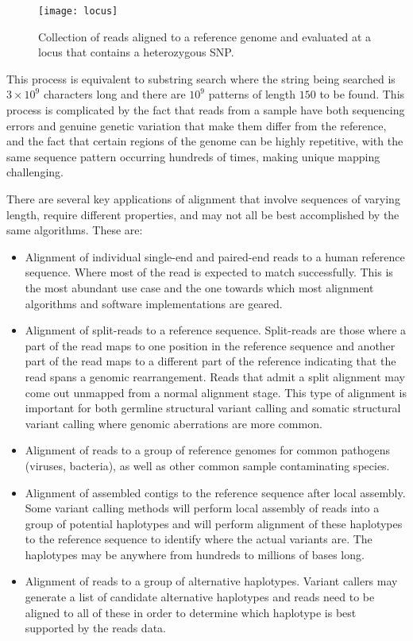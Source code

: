 \begin{figure}[H]
    \texttt{[image: locus]}
    \centering
    \caption {Collection of reads aligned to a reference genome and evaluated at a locus that contains a heterozygous SNP.}
    \label{fig:bg_locus}
\end{figure}

This process is equivalent to substring search where the string being searched is $3\times10^9$ characters long and there are $10^9$ patterns of length $150$ to be found. This process is complicated by the fact that reads from a sample have both sequencing errors and genuine genetic variation that make them differ from the reference, and the fact that certain regions of the genome can be highly repetitive, with the same sequence pattern occurring hundreds of times, making unique mapping challenging.

There are several key applications of alignment that involve sequences of varying length, require different properties, and may not all be best accomplished by the same algorithms. 
\clearpage 
These are:

\begin{itemize}
    \item Alignment of individual single-end and paired-end reads to a human reference sequence. Where most of the read is expected to match successfully. This is the most abundant use case and the one towards which most alignment algorithms and software implementations are geared.
    \item Alignment of split-reads to a reference sequence. Split-reads are those where a part of the read maps to one position in the reference sequence and another part of the read maps to a different part of the reference indicating that the read spans a genomic rearrangement. Reads that admit a split alignment may come out unmapped from a normal alignment stage. This type of alignment is important for both germline structural variant calling and somatic structural variant calling where genomic aberrations are more common.
    \item Alignment of reads to a group of reference genomes for common pathogens (viruses, bacteria), as well as other common sample contaminating species.
    \item Alignment of assembled contigs to the reference sequence after local assembly. Some variant calling methods will perform local assembly of reads into a group of potential haplotypes and will perform alignment of these haplotypes to the reference sequence to identify where the actual variants are. The haplotypes may be anywhere from hundreds to millions of bases long.
    \item Alignment of reads to a group of alternative haplotypes. Variant callers may generate a list of candidate alternative haplotypes and reads need to be aligned to all of these in order to determine which haplotype is best supported by the reads data.      
\end{itemize}


